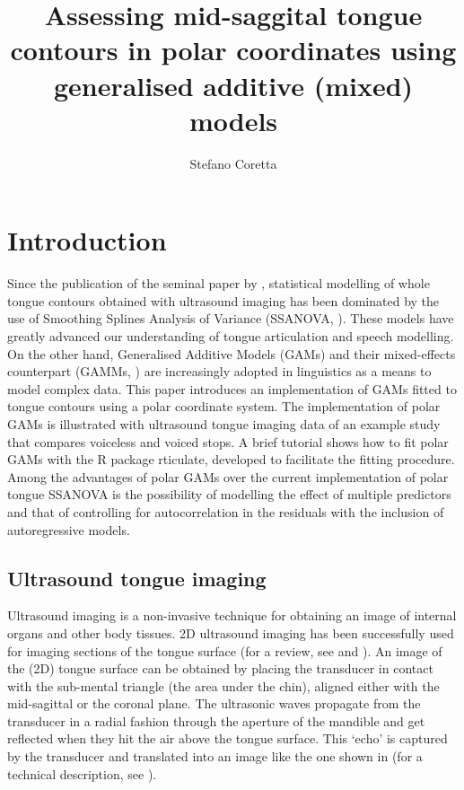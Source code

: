\documentclass[12pt,]{article}
\title{Assessing mid-saggital tongue contours in polar coordinates using
generalised additive (mixed) models}
\author{Stefano Coretta}
\date{}
\begin{document}
\maketitle

\hypertarget{introduction}{%
\section{Introduction}\label{introduction}}

Since the publication of the seminal paper by \citet{davidson2006},
statistical modelling of whole tongue contours obtained with ultrasound
imaging has been dominated by the use of Smoothing Splines Analysis of
Variance (SSANOVA, \citealt{gu2013}). These models have greatly advanced
our understanding of tongue articulation and speech modelling. On the
other hand, Generalised Additive Models (GAMs) and their mixed-effects
counterpart (GAMMs, \citealt{wood2006}) are increasingly adopted in
linguistics as a means to model complex data. This paper introduces an
implementation of GAMs fitted to tongue contours using a polar
coordinate system. The implementation of polar GAMs is illustrated with
ultrasound tongue imaging data of an example study that compares
voiceless and voiced stops. A brief tutorial shows how to fit polar GAMs
with the R package rticulate, developed to facilitate the fitting
procedure. Among the advantages of polar GAMs over the current
implementation of polar tongue SSANOVA is the possibility of modelling
the effect of multiple predictors and that of controlling for
autocorrelation in the residuals with the inclusion of autoregressive
models.

\hypertarget{ultrasound-tongue-imaging}{%
\subsection{Ultrasound tongue imaging}\label{ultrasound-tongue-imaging}}

Ultrasound imaging is a non-invasive technique for obtaining an image of
internal organs and other body tissues. 2D ultrasound imaging has been
successfully used for imaging sections of the tongue surface (for a
review, see \citealt{gick2002} and \citealt{lulich2018}). An image of
the (2D) tongue surface can be obtained by placing the transducer in
contact with the sub-mental triangle (the area under the chin), aligned
either with the mid-sagittal or the coronal plane. The ultrasonic waves
propagate from the transducer in a radial fashion through the aperture
of the mandible and get reflected when they hit the air above the tongue
surface. This `echo' is captured by the transducer and translated into
an image like the one shown in  (for a technical
description, see \citet{stone2005}).
\end{document}
